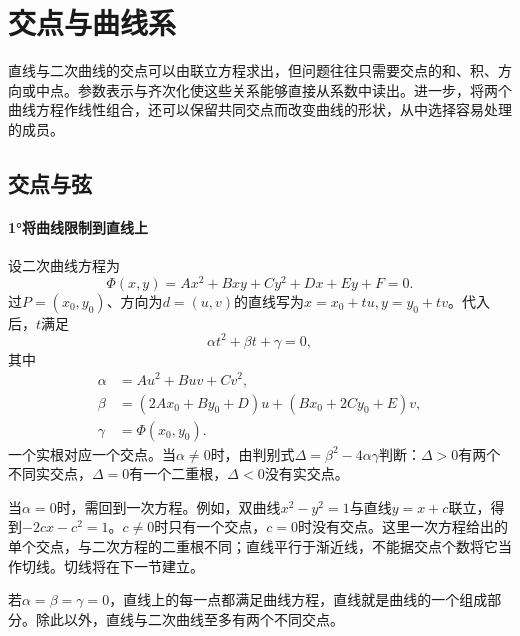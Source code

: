 \newpage
\section{交点与曲线系}
\label{sec:quadratic-intersections-and-families}

直线与二次曲线的交点可以由联立方程求出，但问题往往只需要交点的和、积、方向或中点。参数表示与齐次化使这些关系能够直接从系数中读出。进一步，将两个曲线方程作线性组合，还可以保留共同交点而改变曲线的形状，从中选择容易处理的成员。

\subsection{交点与弦}
\label{subsec:quadratic-intersections-and-chords}

\paragraph{1°将曲线限制到直线上} \mbox{}

设二次曲线方程为
\begin{equation*}
    \Phi(x,y)=Ax^2+Bxy+Cy^2+Dx+Ey+F=0 .
\end{equation*}
过\(P=(x_0,y_0)\)、方向为\(d=(u,v)\)的直线写为\(x=x_0+tu,y=y_0+tv\)。代入后，\(t\)满足
\begin{equation}\label{eq:quadratic-line-restriction-polynomial}
    \alpha t^2+\beta t+\gamma=0 ,
\end{equation}
其中
\begin{equation}\label{eq:quadratic-line-restriction-coefficients}
    \begin{aligned}
    \alpha&=Au^2+Buv+Cv^2,\\
    \beta&=(2Ax_0+By_0+D)u+(Bx_0+2Cy_0+E)v,\\
    \gamma&=\Phi(x_0,y_0).
    \end{aligned}
\end{equation}
一个实根对应一个交点。当\(\alpha\ne0\)时，由判别式\(\Delta=\beta^2-4\alpha\gamma\)判断：\(\Delta>0\)有两个不同实交点，\(\Delta=0\)有一个二重根，\(\Delta<0\)没有实交点。

当\(\alpha=0\)时，需回到一次方程。例如，双曲线\(x^2-y^2=1\)与直线\(y=x+c\)联立，得到\(-2cx-c^2=1\)。\(c\ne0\)时只有一个交点，\(c=0\)时没有交点。这里一次方程给出的单个交点，与二次方程的二重根不同；直线平行于渐近线，不能据交点个数将它当作切线。切线将在下一节建立。

若\(\alpha=\beta=\gamma=0\)，直线上的每一点都满足曲线方程，直线就是曲线的一个组成部分。除此以外，直线与二次曲线至多有两个不同交点。

